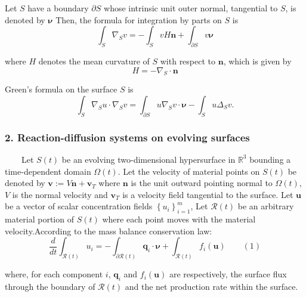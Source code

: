 \documentclass[notheorems,serif]{beamer}
\begin{document}
\begin{frame}
Let $S$ have a boundary $\partial S$ whose intrinsic unit outer normal, tangential to $S$, is denoted by $\boldsymbol{\nu}$ Then, the formula for integration by parts on $S$ is
\begin{equation*}
\int_S\nabla_Sv=-\int_SvH\boldsymbol{n}+\int_{\partial S}v\boldsymbol{\nu}
\end{equation*}

where $H$ denotes the mean curvature of $S$ with respect to $\boldsymbol{n}$, which is given by 
\begin{equation*}
H=-\nabla_S\cdot\boldsymbol{n}
\end{equation*}

Green's formula on the surface $S$ is
\begin{equation*}
\int_S\nabla_Su\cdot\nabla_Sv=\int_{\partial S}u\nabla_Sv\cdot\boldsymbol{\nu}-\int_Su\Delta_Sv.
\end{equation*}
\end{frame}
\begin{frame}
\frametitle{\small 2. Reaction-diffusion systems on evolving surfaces}
$\qquad$Let $S(t)$ be an evolving two-dimensional hypersurface in $\mathbb{R}^3$ bounding a time-dependent domain $\Omega(t)$. Let the velocity of material points on $S(t)$ be denoted by $\boldsymbol{v}:=V\boldsymbol{n}+\boldsymbol{v}_T$ where $\boldsymbol{n}$ is the unit outward pointing normal to $\Omega(t)$, $V$ is the normal velocity and $\boldsymbol{v}_T$ is a velocity field tangential to the surface. Let $\boldsymbol{u}$ be a vector of scalar concentration fields $\left\{u_i\right\}_{i=1}^m$, Let $\mathcal{R}(t)$ be an arbitrary material portion of $S(t)$ where each point moves with the material velocity.According to the mass balance conservation law:
\begin{equation*}
\frac{d}{dt}\int_{\mathcal{R}(t)}u_i=-\int_{\partial\mathcal{R}(t)}\boldsymbol{q}_i\cdot\boldsymbol{\nu}+\int_{\mathcal{R}(t)}f_i(\boldsymbol{u})\qquad(1)
\end{equation*}

where, for each component $i$, $\boldsymbol{q}_i$ and $f_i(\boldsymbol{u})$ are respectively, the surface flux through the boundary of $\mathcal{R}(t)$ and the net production rate within the surface.
\end{frame}
\end{document}
